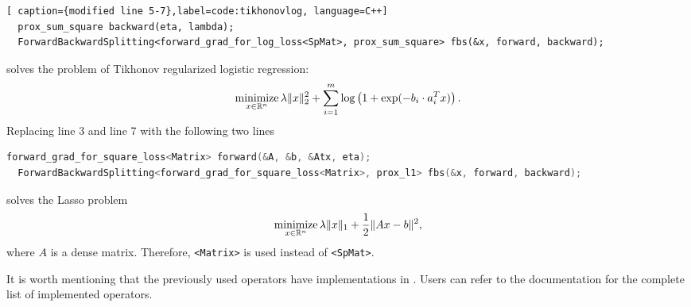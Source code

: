 \begin{lstlisting}[ caption={modified line 5-7},label=code:tikhonovlog, language=C++]
  prox_sum_square backward(eta, lambda);
  ForwardBackwardSplitting<forward_grad_for_log_loss<SpMat>, prox_sum_square> fbs(&x, forward, backward);
\end{lstlisting}
solves the problem of Tikhonov regularized logistic regression:
$$\operatorname*{minimize}_{x \in \mathbb{R}^n} \lambda \|x\|_2^2 + \sum_{i = 1}^m \log\left(1 + \exp(-b_i \cdot a_i^T x)\right).$$
Replacing line 3 and line 7 with
the following two lines
\begin{lstlisting}[caption={replaced line 3 and line 7},label=code:LASSO, language=C++]
  forward_grad_for_square_loss<Matrix> forward(&A, &b, &Atx, eta);
  ForwardBackwardSplitting<forward_grad_for_square_loss<Matrix>, prox_l1> fbs(&x, forward, backward);
\end{lstlisting}
solves the Lasso problem
$$\operatorname*{minimize}_{x \in \mathbb{R}^n} \lambda \|x\|_1 + \frac{1}{2}\|A x - b\|^2,$$
where $A$ is a dense matrix. Therefore, \texttt{<Matrix>} is used instead of \texttt{<SpMat>}.

It is worth mentioning that the previously used operators have implementations in \pkg. Users can refer to the documentation for
the complete list of implemented operators.

